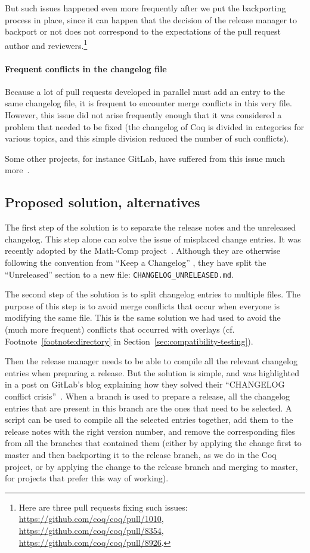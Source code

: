 But such issues happened even more frequently after we put the backporting process in place, since it can happen that the decision of the release manager to backport or not does not correspond to the expectations of the pull request author and reviewers.\footnote{
	Here are three pull requests fixing such issues: \url{https://github.com/coq/coq/pull/1010}, \url{https://github.com/coq/coq/pull/8354}, \url{https://github.com/coq/coq/pull/8926}.
}

\paragraph{Frequent conflicts in the changelog file}

Because a lot of pull requests developed in parallel must add an entry to the same changelog file, it is frequent to encounter merge conflicts in this very file.
However, this issue did not arise frequently enough that it was considered a problem that needed to be fixed (the changelog of Coq is divided in categories for various topics, and this simple division reduced the number of such conflicts).

Some other projects, for instance GitLab, have suffered from this issue much more~\cite{speicher2018changelog}.

\subsection{Proposed solution, alternatives}

The first step of the solution is to separate the release notes and the unreleased changelog.
This step alone can solve the issue of misplaced change entries.
It was recently adopted by the Math-Comp project~\cite{math-comp-meeting-notes}.
Although they are otherwise following the convention from ``Keep a Changelog'' \cite{keep_a_changelog}, they have split the ``Unreleased'' section to a new file: \verb|CHANGELOG_UNRELEASED.md|.

The second step of the solution is to split changelog entries to multiple files.
The purpose of this step is to avoid merge conflicts that occur when everyone is modifying the same file.
This is the same solution we had used to avoid the (much more frequent) conflicts that occurred with overlays (cf. Footnote~\ref{footnote:directory} in Section~\ref{sec:compatibility-testing}).

Then the release manager needs to be able to compile all the relevant changelog entries when preparing a release.
But the solution is simple, and was highlighted in a post on GitLab's blog explaining how they solved their ``CHANGELOG conflict crisis''~\cite{speicher2018changelog}.
When a branch is used to prepare a release, all the changelog entries that are present in this branch are the ones that need to be selected.
A script can be used to compile all the selected entries together, add them to the release notes with the right version number, and remove the corresponding files from all the branches that contained them (either by applying the change first to master and then backporting it to the release branch, as we do in the Coq project, or by applying the change to the release branch and merging to master, for projects that prefer this way of working).

